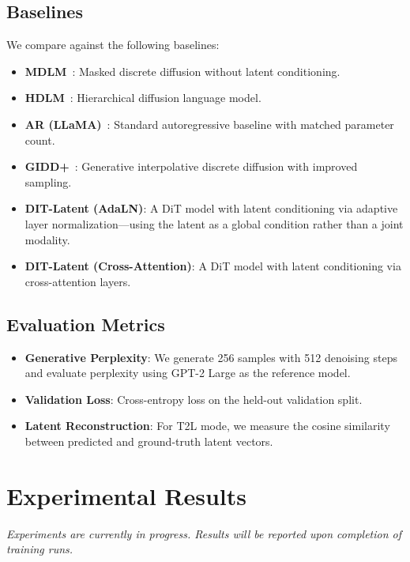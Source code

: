 \documentclass{article}
\begin{document}
\subsection{Baselines}

We compare against the following baselines:
\begin{itemize}[leftmargin=*]
    \item \textbf{MDLM}~\citep{lou2024mdlm}: Masked discrete diffusion without latent conditioning.
    \item \textbf{HDLM}~\citep{gulrajani2024hdlm}: Hierarchical diffusion language model.
    \item \textbf{AR (LLaMA)}~\citep{radford2019gpt2}: Standard autoregressive baseline with matched parameter count.
    \item \textbf{GIDD+}~\citep{ruette2024gidd}: Generative interpolative discrete diffusion with improved sampling.
    \item \textbf{DIT-Latent (AdaLN)}: A DiT model with latent conditioning via adaptive layer normalization---using the latent as a global condition rather than a joint modality.
    \item \textbf{DIT-Latent (Cross-Attention)}: A DiT model with latent conditioning via cross-attention layers.
\end{itemize}

\subsection{Evaluation Metrics}

\begin{itemize}[leftmargin=*]
    \item \textbf{Generative Perplexity}: We generate 256 samples with 512 denoising steps and evaluate perplexity using GPT-2 Large as the reference model.
    \item \textbf{Validation Loss}: Cross-entropy loss on the held-out validation split.
    \item \textbf{Latent Reconstruction}: For T2L mode, we measure the cosine similarity between predicted and ground-truth latent vectors.
\end{itemize}

\section{Experimental Results}\label{sec:results}

\emph{Experiments are currently in progress. Results will be reported upon completion of training runs.}
\end{document}
